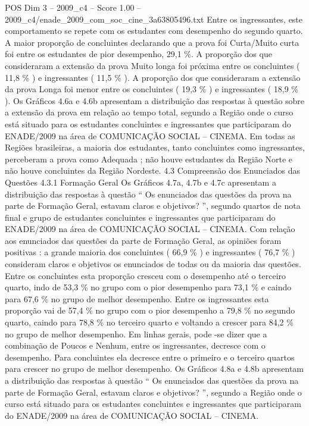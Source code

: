 \begin{textsample}{POS Dim 3 – 2009\_c4 – Score 1.00 – 2009\_c4/enade\_2009\_com\_soc\_cine\_3a63805496.txt}
Entre os ingressantes, este comportamento se repete com os estudantes com desempenho do segundo quarto.
A maior proporção de concluintes declarando que a prova foi Curta/Muito curta foi entre os estudantes de pior desempenho, 29,1 \%.
A proporção dos que consideraram a extensão da prova Muito longa foi próxima entre os concluintes ( 11,8 \% ) e ingressantes ( 11,5 \% ).
A proporção dos que consideraram a extensão da prova Longa foi menor entre os concluintes ( 19,3 \% ) e ingressantes ( 18,9 \% ).
Os Gráficos 4.6a e 4.6b apresentam a distribuição das respostas à questão sobre a extensão da prova em relação ao tempo total, segundo a Região onde o curso está situado para os estudantes concluintes e ingressantes que participaram do ENADE/2009 na área de COMUNICAÇÃO SOCIAL – CINEMA.
Em todas as Regiões brasileiras, a maioria dos estudantes, tanto concluintes como ingressantes, perceberam a prova como Adequada ; não houve estudantes da Região Norte e não houve concluintes da Região Nordeste. 4.3 Compreensão dos Enunciados das Questões 4.3.1 Formação Geral Os Gráficos 4.7a, 4.7b e 4.7c apresentam a distribuição das respostas à questão “ Os enunciados das questões da prova na parte de Formação Geral, estavam claros e objetivos? ”, segundo quartos de nota final e grupo de estudantes concluintes e ingressantes que participaram do ENADE/2009 na área de COMUNICAÇÃO SOCIAL – CINEMA.
Com relação aos enunciados das questões da parte de Formação Geral, as opiniões foram positivas : a grande maioria dos concluintes ( 66,9 \% ) e ingressantes ( 76,7 \% ) consideram claros e objetivos os enunciados de todas ou da maioria das questões.
Entre os concluintes esta proporção cresceu com o desempenho até o terceiro quarto, indo de 53,3 \% no grupo com o pior desempenho para 73,1 \% e caindo para 67,6 \% no grupo de melhor desempenho.
Entre os ingressantes esta proporção vai de 57,4 \% no grupo com o pior desempenho a 79,8 \% no segundo quarto, caindo para 78,8 \% no terceiro quarto e voltando a crescer para 84,2 \% no grupo de melhor desempenho.
Em linhas gerais, pode -se dizer que a combinação de Poucos e Nenhum, entre os ingressantes, decresce com o desempenho.
Para concluintes ela decresce entre o primeiro e o terceiro quartos para crescer no grupo de melhor desempenho.
Os Gráficos 4.8a e 4.8b apresentam a distribuição das respostas à questão “ Os enunciados das questões da prova na parte de Formação Geral, estavam claros e objetivos? ”, segundo a Região onde o curso está situado para os estudantes concluintes e ingressantes que participaram do ENADE/2009 na área de COMUNICAÇÃO SOCIAL – CINEMA.

\end{textsample}
